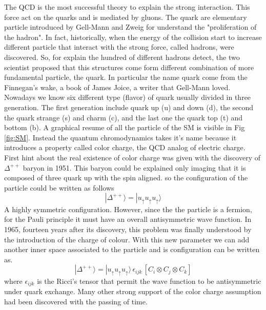 \documentclass[12pt,a4paper]{book}
\begin{document}
	 
	The QCD is the most successful theory to explain the strong interaction. This force act on the quarks and is mediated by gluons. The quark are elementary particle introduced by Gell-Mann and Zweig for understand the "proliferation of the hadron". In fact, historically, when the energy of the collision start to increase different particle that interact with the strong force, called hadrons, were discovered. So, for explain the hundred of different hadrons detect, the two scientist proposed that this structures come form different combination of more fundamental particle, the quark. In particular the name quark come from the Finnegan's wake, a book of James Joice, a writer that Gell-Mann loved. Nowadays we know six different type (flavor) of quark usually divided in three generation. The first generation include quark up (u) and down (d), the second the quark strange (s) and charm (c), and the last one the quark top (t) and bottom (b). A graphical resume of all the particle of the SM is visible in Fig \ref{fig:SM}. Instead the quantum chromodynamics takes it's name because it introduces a property called color charge, the QCD analog of electric charge. 
	First hint about the real existence of color charge was given with the discovery of $\Delta^{++}$ baryon in 1951. This baryon could be explained only imaging that it is composed of three quark up with the spin aligned. so the configuration of the particle could be written as follows 
	\[
	|\Delta^{++}\rangle = | u_{\uparrow} u_{\uparrow} u_{\uparrow} \rangle
	\]
	A highly symmetric configuration. However, since the the particle is a fermion, for the Pauli principle it must have an overall antisymmetric wave function. In 1965, fourteen years after its discovery, this problem was finally understood by the introduction of the charge of colour. With this new parameter we can add another inner space associated to the particle and is configuration can be written as.
	\[
	|\Delta^{++}\rangle = | u_{\uparrow} u_{\uparrow} u_{\uparrow} \rangle \, \epsilon_{ijk} \, \left[ C_i \otimes C_j \otimes C_k \right]
	\]
	where $\epsilon_{ijk}$ is the Ricci's tensor that permit the wave function to be antisymmetric under quark exchange. Many other strong support of the color charge assumption had been discovered with the passing of time.
	
\end{document}
